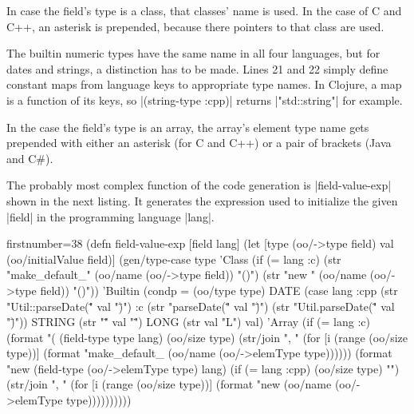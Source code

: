 \documentclass[a4paper]{article}
\newcommand{\code}{\clojureinline}
\begin{document}
In case the field's type is a class, that classes' name is used.  In the case
of C and C++, an asterisk is prepended, because there pointers to that class
are used.

The builtin numeric types have the same name in all four languages, but for
dates and strings, a distinction has to be made.  Lines 21 and 22 simply define
constant maps from language keys to appropriate type names.  In Clojure, a map
is a function of its keys, so \code|(string-type :cpp)| returns
\code|"std::string"| for example.

In the case the field's type is an array, the array's element type name gets
prepended with either an asterisk (for C and C++) or a pair of brackets (Java
and C\#).

The probably most complex function of the code generation is
\code|field-value-exp| shown in the next listing.  It generates the expression
used to initialize the given \code|field| in the programming language
\code|lang|.

\begin{clojurecode*}{firstnumber=38}
(defn field-value-exp [field lang]
  (let [type (oo/->type field)
        val (oo/initialValue field)]
    (gen/type-case type
      'Class (if (= lang :c)
               (str "make_default_" (oo/name (oo/->type field)) "()")
               (str "new " (oo/name (oo/->type field)) "()"))
      'Builtin (condp = (oo/type type)
                 DATE   (case lang
                          :cpp (str "Util::parseDate(\"" val "\")")
                          :c   (str "parseDate(\"" val "\")")
                          (str "Util.parseDate(\"" val "\")"))
                 STRING (str "\"" val "\"")
                 LONG   (str val "L")
                 val)
      'Array (if (= lang :c)
               (format "(%
                       (field-type type lang)
                       (oo/size type)
                       (str/join ", " (for [i (range (oo/size type))]
                                        (format "make_default_%
                                                (oo/name (oo/->elemType type))))))
               (format "new %
                       (field-type (oo/->elemType type) lang)
                       (if (= lang :cpp) (oo/size type) "")
                       (str/join ", " (for [i (range (oo/size type))]
                                        (format "new %
                                                (oo/name (oo/->elemType type))))))))))
\end{clojurecode*}
\end{document}
